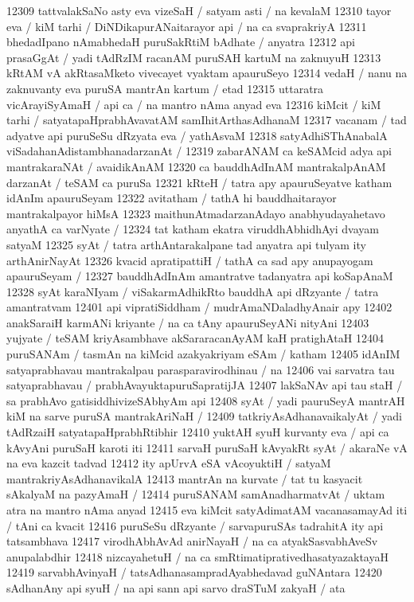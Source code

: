 12309 tattvalakSaNo asty eva vizeSaH / satyam asti / na kevalaM 
12310 tayor eva / kiM tarhi / DiNDikapurANaitarayor api / na ca svaprakriyA
12311 bhedadIpano nAmabhedaH puruSakRtiM bAdhate / anyatra 
12312 api prasaGgAt / yadi tAdRzIM racanAM puruSAH kartuM na zaknuyuH
12313 kRtAM vA akRtasaMketo vivecayet vyaktam apauruSeyo
12314 vedaH / nanu na zaknuvanty eva puruSA mantrAn kartum / etad 
12315 uttaratra vicArayiSyAmaH / api ca / na mantro nAma anyad eva  
12316 kiMcit / kiM tarhi / satyatapaHprabhAvavatAM samIhitArthasAdhanaM
12317 vacanam / tad adyatve api puruSeSu dRzyata eva / yathAsvaM
12318 satyAdhiSThAnabalA viSadahanAdistambhanadarzanAt /
12319 zabarANAM ca keSAMcid adya api mantrakaraNAt / avaidikAnAM
12320 ca bauddhAdInAM mantrakalpAnAM darzanAt / teSAM ca puruSa
12321 kRteH / tatra apy apauruSeyatve katham idAnIm apauruSeyam
12322 avitatham / tathA hi bauddhaitarayor mantrakalpayor hiMsA
12323 maithunAtmadarzanAdayo anabhyudayahetavo anyathA ca varNyate /
12324 tat katham ekatra viruddhAbhidhAyi dvayam satyaM  
12325 syAt / tatra arthAntarakalpane tad anyatra api tulyam ity arthAnirNayAt
12326 kvacid apratipattiH / tathA ca sad apy anupayogam apauruSeyam / 
12327 bauddhAdInAm amantratve tadanyatra api koSapAnaM
12328 syAt karaNIyam / viSakarmAdhikRto bauddhA api dRzyante / tatra amantratvam
12401 api vipratiSiddham / mudrAmaNDaladhyAnair apy 
12402 anakSaraiH karmANi kriyante / na ca tAny apauruSeyANi nityAni
12403 yujyate / teSAM kriyAsambhave akSararacanAyAM kaH pratighAtaH
12404 puruSANAm / tasmAn na kiMcid azakyakriyam eSAm / katham  
12405 idAnIM satyaprabhavau mantrakalpau parasparavirodhinau / na 
12406 vai sarvatra tau satyaprabhavau / prabhAvayuktapuruSapratijJA
12407 lakSaNAv api tau staH / sa prabhAvo gatisiddhivizeSAbhyAm api 
12408 syAt / yadi pauruSeyA mantrAH kiM na sarve puruSA mantrakAriNaH /
12409 tatkriyAsAdhanavaikalyAt / yadi tAdRzaiH satyatapaHprabhRtibhir  
12410 yuktAH syuH kurvanty eva / api ca kAvyAni puruSaH karoti iti 
12411 sarvaH puruSaH kAvyakRt syAt / akaraNe vA na eva kazcit tadvad  
12412 ity apUrvA eSA vAcoyuktiH / satyaM mantrakriyAsAdhanavikalA 
12413 mantrAn na kurvate / tat tu kasyacit sAkalyaM na pazyAmaH /
12414 puruSANAM samAnadharmatvAt / uktam atra na mantro nAma anyad  
12415 eva kiMcit satyAdimatAM vacanasamayAd iti / tAni ca kvacit
12416 puruSeSu dRzyante / sarvapuruSAs tadrahitA ity api tatsambhava
12417 virodhAbhAvAd anirNayaH / na ca atyakSasvabhAveSv anupalabdhir
12418 nizcayahetuH / na ca smRtimatiprativedhasatyazaktayaH 
12419 sarvabhAvinyaH / tatsAdhanasampradAyabhedavad guNAntara  
12420 sAdhanAny api syuH / na api sann api sarvo draSTuM zakyaH / ata
